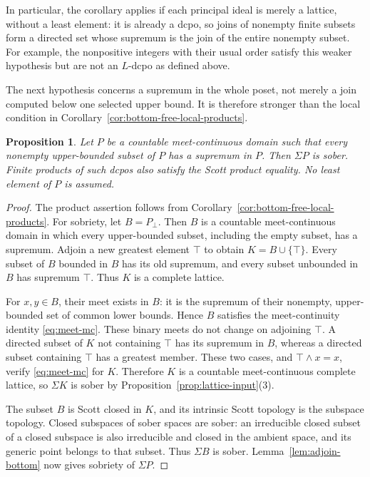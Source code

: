 \documentclass[11pt,reqno]{amsart}
\newtheorem{proposition}[theorem]{Proposition}
\theoremstyle{definition}
\theoremstyle{remark}
\numberwithin{equation}{section}
\newcommand{\Sig}{\Sigma}
\newcommand{\mc}{\wedge}
\begin{document}
In particular, the corollary applies if each principal ideal is merely a lattice, without a least element: it is already a dcpo, so joins of nonempty finite subsets form a directed set whose supremum is the join of the entire nonempty subset. For example, the nonpositive integers with their usual order satisfy this weaker hypothesis but are not an $L$-dcpo as defined above.

The next hypothesis concerns a supremum in the whole poset, not merely a join computed below one selected upper bound. It is therefore stronger than the local condition in Corollary~\ref{cor:bottom-free-local-products}.

\begin{proposition}\label{prop:bounded-complete-sober}
Let $P$ be a countable meet-continuous domain such that every nonempty upper-bounded subset of $P$ has a supremum in $P$. Then $\Sig P$ is sober. Finite products of such dcpos also satisfy the Scott product equality. No least element of $P$ is assumed.
\end{proposition}
\begin{proof}
The product assertion follows from Corollary~\ref{cor:bottom-free-local-products}. For sobriety, let $B=P_\bot$. Then $B$ is a countable meet-continuous domain in which every upper-bounded subset, including the empty subset, has a supremum. Adjoin a new greatest element $\top$ to obtain $K=B\cup\{\top\}$. Every subset of $B$ bounded in $B$ has its old supremum, and every subset unbounded in $B$ has supremum $\top$. Thus $K$ is a complete lattice.

For $x,y\in B$, their meet exists in $B$: it is the supremum of their nonempty, upper-bounded set of common lower bounds. Hence $B$ satisfies the meet-continuity identity \eqref{eq:meet-mc}. These binary meets do not change on adjoining $\top$. A directed subset of $K$ not containing $\top$ has its supremum in $B$, whereas a directed subset containing $\top$ has a greatest member. These two cases, and $\top\mc x=x$, verify \eqref{eq:meet-mc} for $K$. Therefore $K$ is a countable meet-continuous complete lattice, so $\Sig K$ is sober by Proposition~\ref{prop:lattice-input}\textup{(3)}.

The subset $B$ is Scott closed in $K$, and its intrinsic Scott topology is the subspace topology. Closed subspaces of sober spaces are sober: an irreducible closed subset of a closed subspace is also irreducible and closed in the ambient space, and its generic point belongs to that subset. Thus $\Sig B$ is sober. Lemma~\ref{lem:adjoin-bottom} now gives sobriety of $\Sig P$.
\end{proof}
\end{document}
